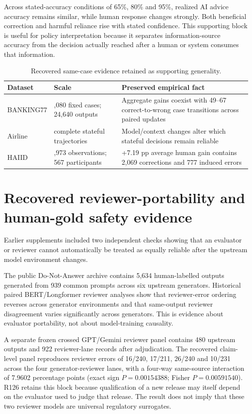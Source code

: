 \documentclass[11pt,letterpaper]{article}
\theoremstyle{plain}
\newcommand{\1}{\mathbf 1}
\begin{document}
Across stated-accuracy conditions of 65\%, 80\% and 95\%, realized AI advice accuracy remains similar, while human response changes strongly. Both beneficial correction and harmful reliance rise with stated confidence. This supporting block is useful for policy interpretation because it separates information-source accuracy from the decision actually reached after a human or system consumes that information.

\begin{table}[H]
\centering
\caption{Recovered same-case evidence retained as supporting generality.}
\label{tab:s_samecase}
\small
\begin{tabularx}{\textwidth}{>{\raggedright\arraybackslash}p{}>{\raggedright\arraybackslash}p{}>{\raggedright\arraybackslash}X}
\toprule
Dataset & Scale & Preserved empirical fact \\
\midrule
BANKING77 & 3,080 fixed cases; 24,640 outputs & Aggregate gains coexist with 49--67 correct-to-wrong case transitions across paired updates \\
Airline & 360 complete stateful trajectories & Model/context changes alter which stateful decisions remain reliable \\
HAIID & 17,973 observations; 567 participants & +7.19 pp average human gain contains 2,069 corrections and 777 induced errors \\
\bottomrule
\end{tabularx}
\end{table}

\clearpage
\section{Recovered reviewer-portability and human-gold safety evidence}
Earlier supplements included two independent checks showing that an evaluator or reviewer cannot automatically be treated as equally reliable after the upstream model environment changes.

The public Do-Not-Answer archive contains 5,634 human-labelled outputs generated from 939 common prompts across six upstream generators. Historical paired BERT/Longformer reviewer analyses show that reviewer-error ordering reverses across generator environments and that same-output reviewer disagreement varies significantly across generators. This is evidence about evaluator portability, not about model-training causality.

A separate frozen crossed GPT/Gemini reviewer panel contains 480 upstream outputs and 922 reviewer-lane records after adjudication. The recovered claim-level panel reproduces reviewer errors of 16/240, 17/211, 26/240 and 10/231 across the four generator-reviewer lanes, with a four-way same-source interaction of 7.9602 percentage points (exact sign $P=0.00154388$; Fisher $P=0.00591540$). R126 retains this block because qualification of a new release may itself depend on the evaluator used to judge that release. The result does not imply that these two reviewer models are universal regulatory surrogates.
\end{document}
